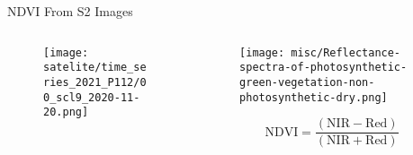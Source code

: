 \begin{frame}{NDVI From S2 Images}

	\begin{columns}
		
	\begin{column}{0.46\textwidth}
		\begin{figure}
			\vspace{-16pt}
			\texttt{[image: satelite/time\_series\_2021\_P112/00\_scl9\_2020-11-20.png]}
		\end{figure}
	\end{column}
		\begin{column}{0.46\textwidth}
			\begin{figure}
					\texttt{[image: misc/Reflectance-spectra-of-photosynthetic-green-vegetation-non-photosynthetic-dry.png]}
			\end{figure}
			\medskip

			$$\mathrm{NDVI}=\frac{(\mathrm{NIR}-\mathrm{Red})}{(\mathrm{NIR}+\mathrm{Red})}$$
		\end{column}
		
	\end{columns}
\end{frame}
